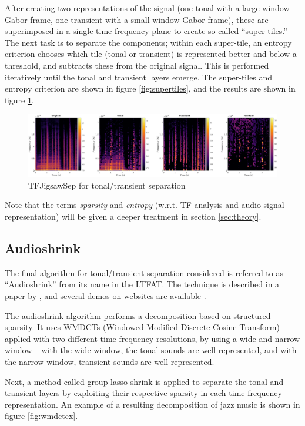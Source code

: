 \documentclass[letter,12pt]{article}
\begin{document}
After creating two representations of the signal (one tonal with a large window Gabor frame, one transient with a small window Gabor frame), these are superimposed in a single time-frequency plane to create so-called ``super-tiles.'' The next task is to separate the components; within each super-tile, an entropy criterion chooses which tile (tonal or transient) is represented better and below a threshold, and subtracts these from the original signal. This is performed iteratively until the tonal and transient layers emerge. The super-tiles and entropy criterion are shown in figure \ref{fig:supertiles}, and the results are shown in figure \ref{fig:tfjigsawdemo}.

\begin{figure}[ht]
	\centering
	\includegraphics[width=16cm]{./tfjigsaw-sep-example.png}
	\caption{TFJigsawSep for tonal/transient separation}
	\label{fig:tfjigsawdemo}
\end{figure}

Note that the terms \textit{sparsity} and \textit{entropy} (w.r.t. TF analysis and audio signal representation) will be given a deeper treatment in section \ref{sec:theory}.

\subsection{Audioshrink}

The final algorithm for tonal/transient separation considered is referred to as ``Audioshrink'' from its name in the LTFAT\cite{wmdct3}. The technique is described in a paper by \citet{wmdct}, and several demos on websites are available \cite{wmdct2, wmdct3}.

The audioshrink algorithm performs a decomposition based on structured sparsity. It uses WMDCTs (Windowed Modified Discrete Cosine Transform) applied with two different time-frequency resolutions, by using a wide and narrow window -- with the wide window, the tonal sounds are well-represented, and with the narrow window, transient sounds are well-represented.

Next, a method called group lasso shrink is applied to separate the tonal and transient layers by exploiting their respective sparsity in each time-frequency representation. An example of a resulting decomposition of jazz music is shown in figure \ref{fig:wmdctex}.
\end{document}
